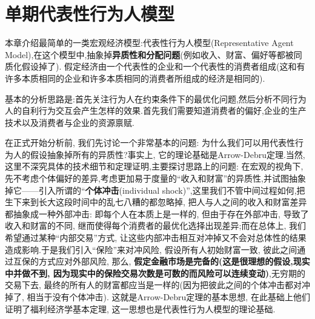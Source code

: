 
\chapter{单期代表性行为人模型}
本章介绍最简单的一类宏观经济模型:代表性行为人模型(Representative Agent Model),在这个模型中,抽象掉\textbf{异质性和分配问题}(例如收入、财富、偏好等都被同质化假设掉了).
假定经济由一个代表性的企业和一个代表性的消费者组成(这和有许多本质相同的企业和许多本质相同的消费者所组成的经济是相同的).

基本的分析思路是:首先关注行为人在约束条件下的最优化问题,然后分析不同行为人的自利行为交互会产生怎样的效果.首先我们需要知道消费者的偏好,企业的生产技术以及消费者与企业的资源禀赋.

{\kaishu 在正式开始分析前, 我们先讨论一个非常基本的问题: 为什么我们可以用代表性行为人的假设抽象掉所有的异质性?事实上, 它的理论基础是Arrow-Debru定理.当然,这里不深究具体的技术细节和定理证明,主要探讨思路上的问题:
在宏观的视角下,先不考虑个体偏好的差异,考虑更加易于度量的“收入和财富”的异质性,并试图抽象掉它——引入所谓的}“\textbf{个体冲击}(individual shock)”,{\kaishu 这里我们不管中间过程如何,把生下来到长大这段时间中的乱七八糟的都忽略掉, 把人与人之间的收入和财富差异都抽象成一种外部冲击: 即每个人在本质上是一样的, 但由于存在外部冲击, 
导致了收入和财富的不同, 继而使得每个消费者的最优化选择出现差异;而在总体上, 我们希望通过某种“内部交易”方式, 让这些内部冲击相互对冲掉又不会对总体性的结果造成影响.于是我们引入“保险”来对冲风险, 假设所有人初始财富一致, 彼此之间通过互保的方式应对外部风险, 那么, }\textbf{假定金融市场是完备的(这是很理想的假设,现实中并做不到, 因为现实中的保险交易次数是可数的而风险可以连续变动)},{\kaishu 无穷期的交易下去, 最终的所有人的财富都应当是一样的(因为把彼此之间的个体冲击都对冲掉了, 相当于没有个体冲击).
这就是Arrow-Debru定理的基本思想, 在此基础上他们证明了福利经济学基本定理, 这一思想也是代表性行为人模型的理论基础.} 
\newpage
